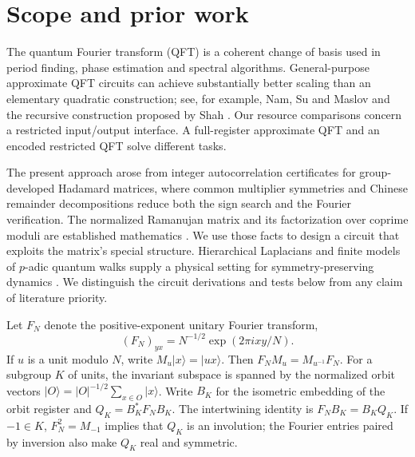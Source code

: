 \documentclass[11pt]{article}
\newcommand{\ket}[1]{\lvert #1\rangle}
\begin{document}
\begin{abstract}
wires; in a registered two-region hardware comparison the edge contrast gain was $+0.071$ and $+0.093$ and did \emph{not} meet the replicated-positive criterion (joint lower bounds $-0.021$ and $+0.0003$), although the arm with fewer gates scored higher on all ten probe--region pairs (Section~\ref{sec:selective}). Novelty of the circuit factorization requires further literature review.
\end{abstract}

\section{Scope and prior work}
The quantum Fourier transform (QFT) is a coherent change of basis used in period finding, phase estimation and spectral algorithms. General-purpose approximate QFT circuits can achieve substantially better scaling than an elementary quadratic construction; see, for example, Nam, Su and Maslov \cite{nam} and the recursive construction proposed by Shah \cite{shah}. Our resource comparisons concern a restricted input/output interface. A full-register approximate QFT and an encoded restricted QFT solve different tasks.

The present approach arose from integer autocorrelation certificates for group-developed Hadamard matrices, where common multiplier symmetries and Chinese remainder decompositions reduce both the sign search and the Fourier verification. The normalized Ramanujan matrix and its factorization over coprime moduli are established mathematics \cite{fowler,brumbaugh}. We use those facts to design a circuit that exploits the matrix's special structure. Hierarchical Laplacians and finite models of $p$-adic quantum walks supply a physical setting for symmetry-preserving dynamics \cite{bendikov,zuniga}. We distinguish the circuit derivations and tests below from any claim of literature priority.

Let $F_N$ denote the positive-exponent unitary Fourier transform,
\begin{equation}
 (F_N)_{yx}=N^{-1/2}\exp(2\pi i xy/N).
\end{equation}
If $u$ is a unit modulo $N$, write $M_u\ket{x}=\ket{ux}$. Then $F_N M_u=M_{u^{-1}}F_N$. For a subgroup $K$ of units, the invariant subspace is spanned by the normalized orbit vectors $\ket{O}=|O|^{-1/2}\sum_{x\in O}\ket{x}$. Write $B_K$ for the isometric embedding of the orbit register and $Q_K=B_K^*F_N B_K$. The intertwining identity is $F_N B_K=B_K Q_K$. If $-1\in K$, $F_N^2=M_{-1}$ implies that $Q_K$ is an involution; the Fourier entries paired by inversion also make $Q_K$ real and symmetric.
\end{document}
